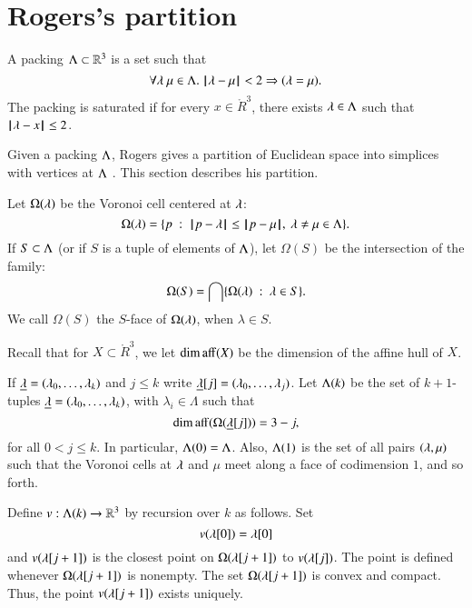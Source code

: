 \section{Rogers's partition}\label{sec:rogers}

\begin{definition}
A packing $\Lambda\subset \mathbb{R}^3$ is a set such that
$$\forall \lambda~\mu\in \Lambda.~  {\hskip0.1em|\hskip-0.15em|\hskip0.1em}\lambda - \mu{\hskip0.1em|\hskip-0.15em|\hskip0.1em} < 2 \Rightarrow (\lambda=\mu).$$
The packing is saturated if for every $x\in\ring{R}^3$,   there exists $\lambda\in\Lambda$
such that ${\hskip0.1em|\hskip-0.15em|\hskip0.1em}\lambda - x{\hskip0.1em|\hskip-0.15em|\hskip0.1em}\le 2$.
\end{definition}


Given a packing $\Lambda$, Rogers gives a partition of Euclidean space into
simplices with vertices at $\Lambda$ \cite{Rogers:1958:Packing}.   This section describes his partition.

Let $\Omega(\lambda)$  be the Voronoi cell centered at $\lambda$:
$$
  \Omega(\lambda) = \{p \ :\   {\hskip0.1em|\hskip-0.15em|\hskip0.1em}p - \lambda{\hskip0.1em|\hskip-0.15em|\hskip0.1em} 
\le {\hskip0.1em|\hskip-0.15em|\hskip0.1em}p - \mu{\hskip0.1em|\hskip-0.15em|\hskip0.1em},\ \lambda\ne\mu\in\Lambda\}.
$$
If $S\subset\Lambda$ (or if $S$ is a tuple of elements of $\Lambda$), 
let $\Omega(S)$ be the intersection of the family:
$$\Omega(S)  = \bigcap \{\Omega(\lambda)\ :\  \lambda\in S \}.$$
We call $\Omega(S)$ the $S$-face of $\Omega(\lambda)$, when $\lambda\in S$.

Recall that for $X\subset\ring{R}^3$, we let $\operatorname{dim\,aff}(X)$ be the dimension of the affine hull
of $X$.

If ${\underline{\lambda}}=(\lambda_0,\ldots,\lambda_k)$ and $j\le k$ write ${\underline{\lambda}}[j] = (\lambda_0,\ldots,\lambda_j)$.
Let $\Lambda(k)$ be the set of $k+1$-tuples ${\underline{\lambda}}=(\lambda_0,\ldots,\lambda_k)$, with
$\lambda_i\in\Lambda$ such
that 
\begin{equation}\label{eqn:omega-dim}
\operatorname{dim\,aff}(\Omega({\underline{\lambda}}[j])) = 3-j,
\end{equation}
for all $0<j\le k$.
In particular, $\Lambda(0)=\Lambda$.  Also, $\Lambda(1)$ is the
set of all pairs $(\lambda,\mu)$ such that the Voronoi cells at $\lambda$ and $\mu$ meet along
a face of codimension $1$, and
so forth.


Define $v:\Lambda(k)\to \mathbb{R}^3$ by recursion over $k$ as follows.
Set $$v(\lambda[0]) = \lambda[0]$$
and $v(\lambda[j+1])$ is the closest point on $\Omega(\lambda[j+1])$ to $v(\lambda[j])$.  The point is defined whenever $\Omega(\lambda[j+1])$ is nonempty.
The set $\Omega(\lambda[j+1])$ is convex and compact.  Thus, the point $v(\lambda[j+1])$ exists
uniquely.

